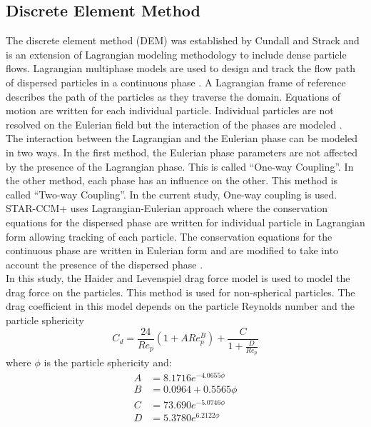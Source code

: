 \subsection{Discrete Element Method}
The discrete element method (DEM) was established by Cundall and Strack \cite{Reference10} and is an extension of Lagrangian modeling methodology to include dense particle flows. Lagrangian multiphase models are used to design and track the flow path of dispersed particles in a continuous phase \cite{Lagrangian}. A Lagrangian frame of reference describes the path of the particles as they traverse the domain. Equations of motion are written for each individual particle. Individual particles are not resolved on the Eulerian field but the interaction of the phases are modeled \cite{Lagrangian}.\\
The interaction between the Lagrangian and the Eulerian phase can be modeled in two ways. In the first method, the Eulerian phase parameters are not affected by the presence of the Lagrangian phase. This is called ``One-way Coupling''. In the other method, each phase has an influence on the other. This method is called ``Two-way Coupling''. In the current study, One-way coupling is used.\\
STAR-CCM+ uses Lagrangian-Eulerian approach where the conservation equations for the dispersed phase are written for individual particle in Lagrangian form allowing tracking of each particle. The conservation equations for the continuous phase are written in Eulerian form and are modified to take into account the presence of the dispersed phase \cite{Lagrangian}.\\
In this study, the Haider and Levenspiel drag force model is used to model the drag force on the particles. This method is used for non-spherical particles. The drag coefficient in this model depends on the particle Reynolds number and the particle sphericity \cite{Lagrangian}
\begin{equation}
C_d = \frac{24}{Re_p} (1 + ARe_p^B) + \frac{C}{1 + \frac{D}{Re_p}} \label{Drag Coeff eq}
\end{equation}
where $\phi$ is the particle sphericity and:
\begin{align*}
A &= 8.1716e^{-4.0655\phi}\\
B &= 0.0964+0.5565\phi\\
C &= 73.690e^{−5.0746\phi}\\
D &= 5.3780e^{6.2122\phi}\\
\end{align*}
